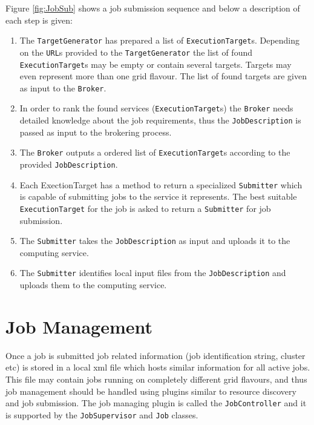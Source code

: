 \documentclass{book}
\newcommand{\Broker}{\texttt{Broker}}
\newcommand{\ExecutionTarget}{\texttt{ExecutionTarget}}
\newcommand{\Job}{\texttt{Job}}
\newcommand{\JobController}{\texttt{JobController}}
\newcommand{\JobDescription}{\texttt{JobDescription}}
\newcommand{\JobSupervisor}{\texttt{JobSupervisor}}
\newcommand{\TargetGenerator}{\texttt{TargetGenerator}}
\newcommand{\Submitter}{\texttt{Submitter}}
\newcommand{\URL}{\texttt{URL}}
\begin{document}
Figure \ref{fig:JobSub} shows a job submission sequence and below a
description of each step is given:

\begin{enumerate}
\item{The {\TargetGenerator} has prepared a list of
  {\ExecutionTarget}s. Depending on the {\URL}s provided to the
  {\TargetGenerator} the list of found {\ExecutionTarget}s may be
  empty or contain several targets. Targets may even represent more
  than one grid flavour. The list of found targets are given as input
  to the {\Broker}.}
\item{In order to rank the found services ({\ExecutionTarget}s) the
  {\Broker} needs detailed knowledge about the job requirements, thus
  the {\JobDescription} is passed as input to the brokering process.}
\item{The {\Broker} outputs a ordered list of {\ExecutionTarget}s
  according to the provided {\JobDescription}.}
\item{Each ExectionTarget has a method to return a specialized
  {\Submitter} which is capable of submitting jobs to the service it
  represents. The best suitable {\ExecutionTarget} for the job is
  asked to return a {\Submitter} for job submission.}
\item{The {\Submitter} takes the {\JobDescription} as input and
  uploads it to the computing service.}
\item{The {\Submitter} identifies local input files from the
  {\JobDescription} and uploads them to the computing service.}
\end{enumerate}

\section{Job Management}

Once a job is submitted job related information (job identification
string, cluster etc) is stored in a local xml file which hosts similar
information for all active jobs. This file may contain jobs running on
completely different grid flavours, and thus job management should be
handled using plugins similar to resource discovery and job
submission. The job managing plugin is called the {\JobController} and
it is supported by the {\JobSupervisor} and {\Job} classes.
\end{document}
